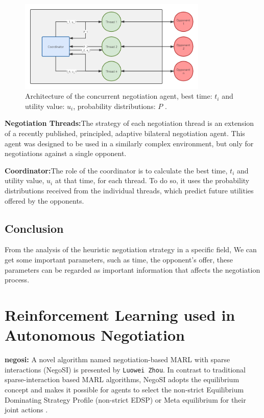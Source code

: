 \begin{figure}[htbp]
\centering
\includegraphics[width=0.8\textwidth]{./images/heuristic_concurrent_negotiation.png}
\caption{Architecture of the concurrent negotiation agent, best time: $t_i$ and utility value: $u_i$, probability distributions: $P$ \parencite{Williams12Concurrent}.}
\label{fig:heuristic-concurrent-negotiation}
\end{figure}

\textbf{Negotiation Threads:}The strategy of each negotiation thread is an extension of a recently published, principled, adaptive bilateral negotiation agent. This agent was designed to be used in a similarly complex environment, but only for negotiations against a single opponent.

\textbf{Coordinator:}The role of the coordinator is to calculate the best time, $t_i$ and utility value, $u_i$ at that time, for each thread. To do so, it uses the probability distributions received from the individual threads, which predict future utilities offered by the opponents.

\subsection{Conclusion}
From the analysis of the heuristic negotiation strategy in a specific field, We can get some important parameters, such as time, the opponent's offer, these parameters can be regarded as important information that affects the negotiation process.

\section{Reinforcement Learning used in Autonomous Negotiation}
\textbf{\gls{negosi}:} A novel algorithm named negotiation-based MARL
with sparse interactions (NegoSI) is presented by \texttt{Luowei Zhou}. In contrast to traditional sparse-interaction based MARL algorithms, NegoSI adopts the equilibrium concept and makes it possible for agents to select the non-strict Equilibrium Dominating Strategy Profile (non-strict EDSP) or Meta equilibrium for their joint actions \parencite{L2017NegoSI}.


